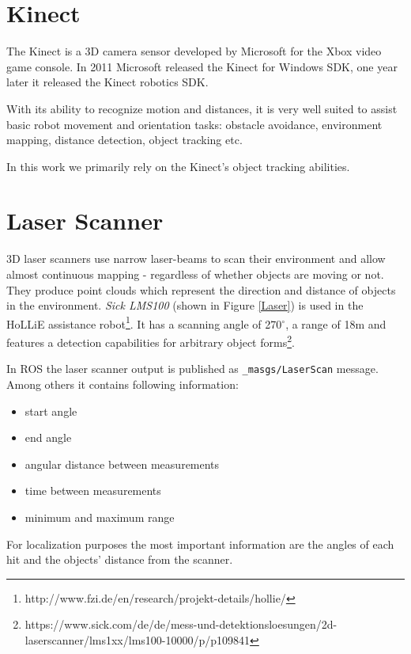 \section{Kinect}
The Kinect is a 3D camera sensor developed by Microsoft for the Xbox video game console. In 2011 Microsoft released the Kinect for Windows SDK, one year later it released the Kinect robotics SDK.

With its ability to recognize motion and distances, it is very well suited to assist basic robot movement and orientation tasks: obstacle avoidance, environment mapping, distance detection, object tracking etc.

In this work we primarily rely on the Kinect's object tracking abilities.
  
\section{Laser Scanner}
3D laser scanners use narrow laser-beams to scan their environment and allow almost continuous mapping - regardless of whether objects are moving or not. They produce point clouds which represent the direction and distance of objects in the environment. \textit{Sick LMS100} (shown in Figure \ref{Laser}) is used in the HoLLiE assistance robot\footnote{http://www.fzi.de/en/research/projekt-details/hollie/}. It has a scanning angle of  270$^\circ$, a range of 18m and features a detection capabilities for arbitrary object forms\footnote{https://www.sick.com/de/de/mess-und-detektionsloesungen/2d-laserscanner/lms1xx/lms100-10000/p/p109841}.

In ROS the laser scanner output is published as \texttt{\_masgs/LaserScan} message. Among others it contains following information:
\begin{itemize}
\item start angle
\item end angle
\item angular distance between measurements
\item time between measurements
\item minimum and maximum range
\end{itemize}

For localization purposes the most important information are the angles of each hit and the objects' distance from the scanner.

